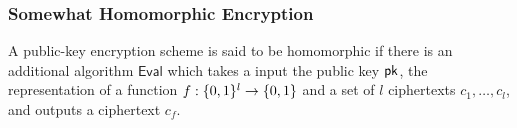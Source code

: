 %

\subsubsection{Somewhat Homomorphic Encryption}
A public-key encryption scheme is said to be homomorphic if there is an 
additional algorithm $\mathsf{Eval}$ which takes a input the public key $\mathsf{pk}$, 
the representation of a function $f:\{0, 1\}^l\rightarrow\{0, 1\}$ and a set of $l$ ciphertexts $c_1,\ldots,c_l$, and outputs a ciphertext $c_f$. 





